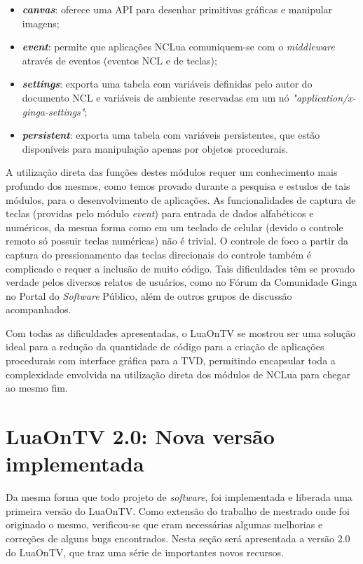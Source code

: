 \begin{itemize}
	\item \textbf{\textit{canvas}}: oferece uma API para desenhar primitivas gráficas e manipular imagens;
  \item \textbf{\textit{event}}: permite que aplicações NCLua comuniquem-se com o \textit{middleware} através de eventos (eventos NCL e de teclas);
  \item \textbf{\textit{settings}}: exporta uma tabela com variáveis definidas pelo autor do documento NCL e variáveis
 de ambiente reservadas em um nó \textit{"application/x-ginga-settings"};
  \item \textbf{\textit{persistent}}: exporta uma tabela com variáveis persistentes, que estão disponíveis para manipulação
    apenas por objetos procedurais.
\end{itemize}

A utilização direta das funções destes módulos requer um conhecimento mais profundo dos mesmos,
como temos provado durante a pesquisa e estudos de tais módulos, para o desenvolvimento
de aplicações. As funcionalidades de captura de teclas (providas pelo módulo \textit{event}) 
para entrada de dados alfabéticos e numéricos, da mesma forma como em um teclado de celular
(devido o controle remoto só possuir teclas numéricas) não é trivial. O controle de foco
a partir da captura do pressionamento das teclas direcionais do controle também é 
complicado e requer a inclusão de muito código. Tais dificuldades têm se provado verdade
pelos diversos relatos de usuários, como no Fórum da Comunidade Ginga no Portal do \textit{Software} Público\cite{ginga-ncl-community},
além de outros grupos de discussão acompanhados.

Com todas as dificuldades apresentadas, o LuaOnTV se mostrou ser uma solução ideal para a redução
da quantidade de código para a criação de aplicações procedurais com interface gráfica para a TVD, 
permitindo encapsular toda a complexidade envolvida na utilização direta dos módulos
de NCLua para chegar ao mesmo fim.

\section{LuaOnTV 2.0: Nova versão implementada}

Da mesma forma que todo projeto de \textit{software}, foi implementada e liberada uma primeira versão do LuaOnTV. 
Como extensão do trabalho de mestrado onde foi originado o mesmo, 
verificou-se que eram necessárias algumas melhorias e correções de alguns
bugs encontrados. Nesta seção será apresentada a versão 2.0
do LuaOnTV, que traz uma série de importantes novos recursos.

